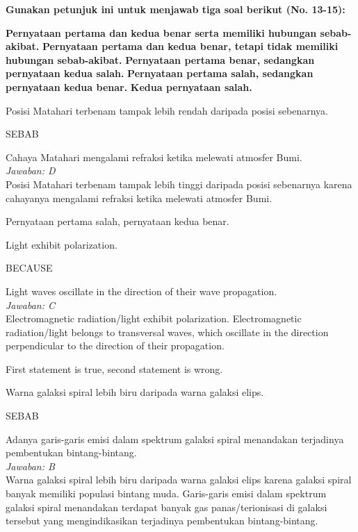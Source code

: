 \documentclass[11pt,fleqn]{exam}
\begin{document}
\begin{questions}
\vspace{0.5cm}
\textbf{Gunakan petunjuk ini untuk menjawab tiga soal berikut (No. 13-15):}
\begin{choices}
\choice \textbf{Pernyataan pertama dan kedua benar serta memiliki hubungan sebab-akibat.}
\choice \textbf{Pernyataan pertama dan kedua benar, tetapi tidak memiliki hubungan sebab-akibat.}
\choice \textbf{Pernyataan pertama benar, sedangkan pernyataan kedua salah.}
\choice \textbf{Pernyataan pertama salah, sedangkan pernyataan kedua benar.}
\choice \textbf{Kedua pernyataan salah.}
\end{choices}

\vspace{0.3cm}
\question Posisi Matahari terbenam tampak lebih rendah daripada posisi sebenarnya.
\begin{center}
SEBAB
\end{center}
Cahaya Matahari mengalami refraksi ketika melewati atmosfer Bumi.\\

\textit{Jawaban: D} \\
Posisi Matahari terbenam tampak lebih tinggi daripada posisi sebenarnya karena cahayanya mengalami refraksi ketika melewati atmosfer Bumi.

Pernyataan pertama salah, pernyataan kedua benar.

\vspace{0.3cm}
\question Light exhibit polarization.
\begin{center}
BECAUSE
\end{center}
Light waves oscillate in the direction of their wave propagation.\\

\textit{Jawaban: C}\\
Electromagnetic radiation/light exhibit polarization. Electromagnetic radiation/light belongs to transversal waves, which oscillate in the direction perpendicular to the direction of their propagation.

First statement is true, second statement is wrong.

\vspace{0.3cm}
\question Warna galaksi spiral lebih biru daripada warna galaksi elips.
\begin{center}
SEBAB
\end{center}
Adanya garis-garis emisi dalam spektrum galaksi spiral menandakan terjadinya pembentukan bintang-bintang.\\

\textit{Jawaban: B} \\
Warna galaksi spiral lebih biru daripada warna galaksi elips karena galaksi spiral banyak memiliki populasi bintang muda. Garis-garis emisi dalam spektrum galaksi spiral menandakan terdapat banyak gas panas/terionisasi di galaksi tersebut yang mengindikasikan terjadinya pembentukan bintang-bintang.


\end{questions}
\end{document}
